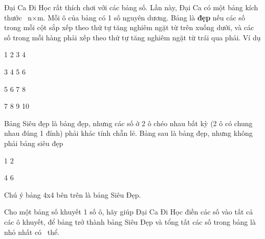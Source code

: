 Đại Ca Đi Học rất thích chơi với các bảng số. Lần này, Đại Ca có một bảng kích thước  n×m. Mỗi ô của bảng có 1 số nguyên dương. Bảng là \textbf{đẹp }nếu các số trong mỗi cột sắp xếp theo thứ tự tăng nghiêm ngặt từ trên xuống dưới, và các số trong mỗi hàng phải xếp theo thứ tự tăng nghiêm ngặt từ trái qua phải. Ví dụ

1 2 3 4

3 4 5 6

5 6 7 8

7 8 9 10

Bảng Siêu đẹp là bảng đẹp, nhưng các số ở 2 ô chéo nhau bất kỳ (2 ô có chung nhau đúng 1 đỉnh) phải khác tính chẵn lẻ. Bảng sau là bảng đẹp, nhưng không phải bảng siêu đẹp

1 2

4 6

Chú ý bảng 4x4 bên trên là bảng Siêu Đẹp.

Cho một bảng số khuyết 1 số ô, hãy giúp Đại Ca Đi Học điền các số vào tất cả các ô khuyết, để bảng trở thành bảng Siêu Đẹp và tổng tất các số trong bảng là nhỏ nhất có  thể.